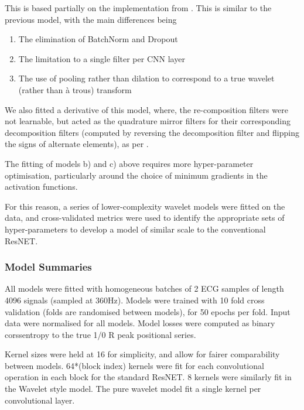 \documentclass[9pt,conference]{IEEEtran}
\begin{document}
This is based partially on the implementation from \cite{despawn}. This is similar to the previous model, with the main differences being

\begin{enumerate}
    \item The elimination of BatchNorm and Dropout
    \item The limitation to a single filter per CNN layer
    \item The use of pooling rather than dilation to correspond to a true wavelet (rather than  à trous) transform
\end{enumerate}

We also fitted a derivative of this model, where, the re-composition filters were not learnable, but acted as the quadrature mirror filters for their corresponding decomposition filters (computed by reversing the decomposition filter and flipping the signs of alternate elements), as per \cite{despawn}.

The fitting of models b) and c) above requires more hyper-parameter optimisation, particularly around the choice of minimum gradients in the activation functions.

For this reason, a series of lower-complexity wavelet models were fitted on the data, and cross-validated metrics were used to identify the appropriate sets of hyper-parameters to develop a model of similar scale to the conventional ResNET.

\subsubsection{Model Summaries}

All models were fitted with homogeneous batches of 2 ECG samples of length 4096 signals (sampled at 360Hz). Models were trained with 10 fold cross validation (folds are randomised between models), for 50 epochs per fold. Input data were normalised for all models. Model losses were computed as binary corssentropy to the true 1/0 R peak positional series.

Kernel sizes were held at 16 for simplicity, and allow for fairer comparability between models. 64*(block index) kernels were fit for each convolutional operation in each block for the standard ResNET. 8 kernels were similarly fit in the Wavelet style model. The pure wavelet model fit a single kernel per convolutional layer. 
\end{document}

